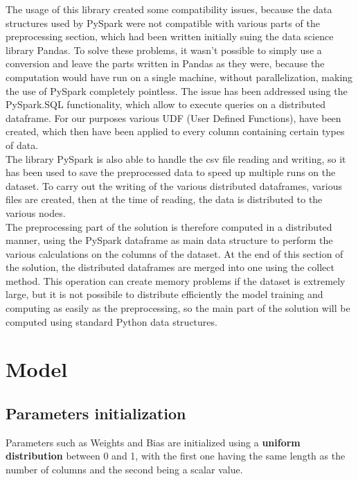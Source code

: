 \documentclass[
	letterpaper, %
	10pt, %
]{class}
\begin{document}
The usage of this library created some compatibility issues, because the data structures used by PySpark were not compatible with various parts of the preprocessing section, which had been written initially suing the data science library Pandas.
To solve these problems, it wasn't possible to simply use a conversion and leave the parts written in Pandas as they were, because the computation would have run on a single machine, without parallelization, making the use of PySpark completely pointless.
The issue has been addressed using the PySpark.SQL functionality, which allow to execute queries on a distributed dataframe. For our purposes various UDF (User Defined Functions), have been created, which then have been applied to every column containing certain types of data.\\

The library PySpark is also able to handle the csv file reading and writing, so it has been used to save the preprocessed data to speed up multiple runs on the dataset. To carry out the writing of the various distributed dataframes, various files are created, then at the time of reading, the data is distributed to the various nodes.\\

The preprocessing part of the solution is therefore computed in a distributed manner, using the PySpark dataframe as main data structure to perform the various calculations on the columns of the dataset.
At the end of this section of the solution, the distributed dataframes are merged into one using the collect method. This operation can create memory problems if the dataset is extremely large, but it is not possibile to distribute efficiently the model training
and computing as easily as the preprocessing, so the main part of the solution will be computed using standard Python data structures.


\section{Model}

\subsection{Parameters initialization}
Parameters such as Weights and Bias are initialized using a \textbf{uniform distribution} between 0 and 1, with the first one having the same length as the number of columns and the second being a scalar value.
\end{document}
